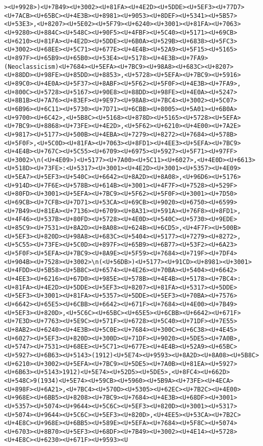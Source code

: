 \documentclass[
]{article}
\begin{document}
\begin{verbatim}
><U+9928>)<U+7B49><U+3002><U+81FA><U+4E2D><U+5DDE><U+5EF3><U+77D7><U+7ACB><U+65BC><U+4E3B><U+8981><U+9053><U+8DEF><U+5341><U+5B57><U+53E3>,<U+8207><U+5E02><U+5F79><U+6240><U+3001><U+81FA><U+7063><U+9280><U+884C><U+548C><U+90F5><U+4FBF><U+5C40><U+5171><U+69CB><U+6210><U+81FA><U+4E2D><U+5DDE><U+6B0A><U+529B><U+6838><U+5FC3><U+3002><U+68EE><U+5C71><U+677E><U+4E4B><U+52A9><U+5F15><U+5165><U+897F><U+65B9><U+65B0><U+53E4><U+5178><U+4E3B><U+7FA9>(Neoclassicism)<U+7684><U+5EFA><U+7BC9><U+98A8><U+683C><U+8207><U+88DD><U+98FE><U+85DD><U+8853>,<U+5728><U+5EFA><U+7BC9><U+5916><U+89C0><U+4E0A><U+5F37><U+8ABF><U+5F62><U+5F0F><U+4E3B><U+7FA9>,<U+800C><U+5728><U+5167><U+90E8><U+88DD><U+98FE><U+4E0A><U+5247><U+8B1B><U+7A76><U+83EF><U+9E97><U+98A8><U+7BC4><U+3002><U+5C07><U+6B96><U+6C11><U+5730><U+7D71><U+6CBB><U+8005><U+5A01><U+6B0A><U+9700><U+6C42>,<U+5B8C><U+5168><U+878D><U+5165><U+5728><U+5EFA><U+7BC9><U+8868><U+73FE><U+4E2D>,<U+5F62><U+6210><U+4E00><U+7A2E><U+9817><U+5177><U+500B><U+4EBA><U+7279><U+8272><U+7684><U+578B><U+5F0F>,<U+5C0D><U+81FA><U+7063><U+8FD1><U+4EE3><U+5EFA><U+7BC9><U+4E4B><U+767C><U+5C55><U+6709><U+6975><U+5927><U+5F71><U+97FF><U+3002>\n(<U+4E09>)<U+5177><U+7A00><U+5C11><U+6027>,<U+4E0D><U+6613><U+518D><U+73FE>:<U+5317><U+3001><U+4E2D><U+3001><U+5357><U+4E09><U+5EA7><U+5EF3><U+540C><U+6642><U+8A2D><U+8A08>,<U+96D6><U+5176><U+914D><U+7F6E><U+578B><U+614B><U+3001><U+4F7F><U+7528><U+529F><U+80FD><U+3001><U+5EFA><U+7BC9><U+5F62><U+5F0F><U+3001><U+7D50><U+69CB><U+7CFB><U+7D71><U+53CA><U+69CB><U+9020><U+6750><U+6599><U+7B49><U+81EA><U+7136><U+6709><U+8A31><U+591A><U+76F8><U+8FD1>,<U+4F46><U+537B><U+80FD><U+5728><U+4E0D><U+540C><U+5730><U+9EDE><U+85C9><U+7531><U+8A2D><U+8A08><U+624B><U+6CD5>,<U+4F7F><U+500B><U+5EF3><U+820D><U+98A8><U+683C><U+5404><U+5177><U+7279><U+8272>,<U+5C55><U+73FE><U+5C0D><U+897F><U+65B9><U+6B77><U+53F2><U+6A23><U+5F0F><U+5EFA><U+7BC9><U+8A9E><U+5F59><U+7684><U+719F><U+7DF4><U+904B><U+7528><U+3002>\n(<U+56DB>)<U+5177><U+91CD><U+8981><U+3001><U+4FDD><U+5B58><U+5B8C><U+6574><U+4E26><U+70BA><U+5404><U+6642><U+4EE3><U+6216><U+67D0><U+985E><U+578B><U+4E4B><U+5178><U+7BC4>:<U+81FA><U+4E2D><U+5DDE><U+5EF3><U+8207><U+81FA><U+5317><U+5DDE><U+5EF3><U+3001><U+81FA><U+5357><U+5DDE><U+5EF3><U+70BA><U+7576><U+6642><U+65E5><U+6CBB><U+6642><U+671F><U+7684><U+4E00><U+7B49><U+5EF3><U+820D>,<U+5C6C><U+65BC><U+65E5><U+6CBB><U+6642><U+671F><U+7E3D><U+7763><U+5E9C><U+571F><U+6728><U+5C40><U+71DF><U+7E55><U+8AB2><U+6240><U+4E3B><U+5C0E><U+7684><U+300C><U+6C38><U+4E45><U+6027><U+5EF3><U+820D><U+300D><U+71DF><U+9020><U+5DE5><U+7A0B>,<U+5747><U+7531><U+68EE><U+5C71><U+677E><U+4E4B><U+52A9><U+65BC><U+5927><U+6B63><U+5143>(1912)<U+5E74><U+9593><U+8A2D><U+8A08><U+5B8C><U+6210><U+3002><U+5EFA><U+7BC9><U+5DE5><U+7A0B><U+81EA><U+5927><U+6B63><U+5143>1912)<U+5E74><U+52D5><U+5DE5>,<U+8FC4><U+662D><U+548C>9(1934)<U+5E74><U+59CB><U+5960><U+5B9A><U+73FE><U+4ECA><U+898F><U+6A21>,<U+7BC4><U+570D><U+5305><U+62EC><U+7B2C><U+4E00><U+968E><U+6BB5><U+8208><U+7BC9><U+7684><U+4E3B><U+68DF><U+3001><U+5357><U+5074><U+9644><U+5C6C><U+5EF3><U+820D><U+3001><U+5317><U+5074><U+9644><U+5C6C><U+5EF3><U+820D>,<U+4EE5><U+53CA><U+7B2C><U+4E8C><U+968E><U+6BB5><U+589E><U+5EFA><U+7684><U+5F8C><U+5074><U+6703><U+8B70><U+5EF3><U+68DF><U+7B49><U+3002><U+4E14><U+5728><U+4E8C><U+6230><U+671F><U+9593><U
\end{verbatim}
\end{document}
